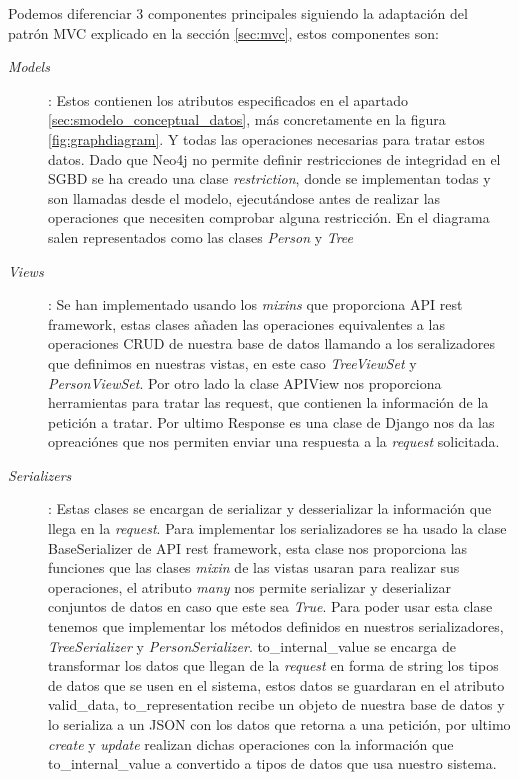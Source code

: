 Podemos diferenciar 3 componentes principales siguiendo la adaptación del patrón MVC explicado en la sección \ref{sec:mvc}, estos componentes son: 
\begin{description}
	\item[\textit{Models}]: Estos contienen los atributos especificados en el apartado \ref{sec:smodelo_conceptual_datos}, más concretamente en la figura \ref{fig:graphdiagram}. Y todas las operaciones necesarias para tratar estos datos. Dado que Neo4j no permite definir restricciones de integridad en el SGBD se ha creado una clase \textit{restriction}, donde se implementan todas y son llamadas desde el modelo, ejecutándose antes de realizar las operaciones que necesiten comprobar alguna restricción. En el diagrama salen representados como las clases \textit{Person} y \textit{Tree}
	
	\item[\textit{Views}]: Se han implementado usando los \textit{mixins} que proporciona API rest framework, estas clases añaden las operaciones equivalentes a las operaciones CRUD de nuestra base de datos llamando a los seralizadores que definimos en nuestras vistas, en este caso \textit{TreeViewSet} y \textit{PersonViewSet}. Por otro lado la clase APIView nos proporciona herramientas para tratar las request, que contienen la información de la petición a tratar. Por ultimo Response es una clase de Django nos da las opreaciónes que nos permiten enviar una respuesta a la \textit{request} solicitada.
	
	\item[\textit{Serializers}]: Estas clases se encargan de serializar y desserializar la información que llega en la \textit{request}. Para implementar los serializadores se ha usado la clase BaseSerializer de API rest framework, esta clase nos proporciona las funciones que las clases \textit{mixin} de las vistas usaran para realizar sus operaciones, el atributo \textit{many} nos permite serializar y deserializar conjuntos de datos en caso que este sea \textit{True}. Para poder usar esta clase tenemos que implementar los métodos definidos en nuestros serializadores, \textit{TreeSerializer} y \textit{PersonSerializer}. to\_internal\_value se encarga de transformar los datos que llegan de la \textit{request} en forma de string los tipos de datos que se usen en el sistema, estos datos se guardaran en el atributo valid\_data, to\_representation recibe un objeto de nuestra base de datos y lo serializa a un JSON con los datos que retorna a una petición, por ultimo \textit{create} y \textit{update} realizan dichas operaciones con la información que to\_internal\_value a convertido a tipos de datos que usa nuestro sistema.
\end{description}

